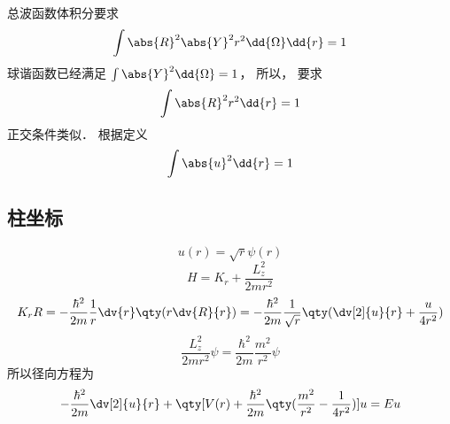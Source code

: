 
总波函数体积分要求
\begin{equation}
\int \abs{R}^2 \abs{Y}^2 r^2 \dd{\Omega}\dd{r}  = 1
\end{equation}
球谐函数已经满足 $\int \abs{Y}^2 \dd{\Omega} = 1$，  所以， 要求
\begin{equation}
\int \abs{R}^2 r^2 \dd{r}  = 1
\end{equation}
正交条件类似． 根据定义
\begin{equation}
\int \abs{u}^2 \dd{r}  = 1
\end{equation}

\subsection{柱坐标}
\begin{equation}
u(r) = \sqrt r \psi (r)
\end{equation}
\begin{equation}
 H = K_r + \frac{L_z^2}{2m r^2}
\end{equation}
\begin{equation}
K_r R = -\frac{\hbar^2}{2m} \frac1r \dv{r} \qty(r \dv{R}{r}) =  - \frac{\hbar^2}{2m} \frac{1}{\sqrt r} \qty(\dv[2]{u}{r} + \frac{u}{4 r^2})
\end{equation}
\begin{equation}
\frac{L_z^2}{2m r^2}\psi  = \frac{\hbar^2}{2m} \frac{m^2}{r^2}\psi 
\end{equation}
所以径向方程为
\begin{equation}
- \frac{\hbar^2}{2m} \dv[2]{u}{r} + \qty[V(r) + \frac{\hbar^2}{2m} \qty(\frac{m^2}{r^2} - \frac{1}{4 r^2})]u = Eu
\end{equation}

